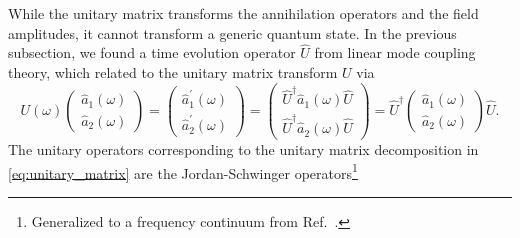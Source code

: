 While the unitary matrix transforms the annihilation operators and the field amplitudes, it cannot transform a generic quantum state.
In the previous subsection, we found a time evolution operator $\hat{U}$ from linear mode coupling theory, which related to the unitary matrix transform $U$ via
\begin{equation}
	U(\omega)
	\begin{pmatrix}
		\hat{a}_1(\omega) \\
		\hat{a}_2(\omega)
	\end{pmatrix}
	=
	\begin{pmatrix}
		\hat{a}_1^\prime(\omega) \\
		\hat{a}_2^\prime(\omega)
	\end{pmatrix}
	=
	\begin{pmatrix}
		\hat{U}^\dagger\hat{a}_1(\omega)\hat{U} \\
		\hat{U}^\dagger\hat{a}_2(\omega)\hat{U}
	\end{pmatrix}
	=
	\hat{U}^\dagger
	\begin{pmatrix}
		\hat{a}_1(\omega) \\
		\hat{a}_2(\omega)
	\end{pmatrix}
	\hat{U}
	\label{eq:unitary_matrix_operator}
	.
\end{equation}
The unitary operators corresponding to the unitary matrix decomposition in \cref{eq:unitary_matrix} are the Jordan-Schwinger operators\footnote{Generalized to a frequency continuum from Ref.~\cite[p.~97]{Leonhardt2010}.}
